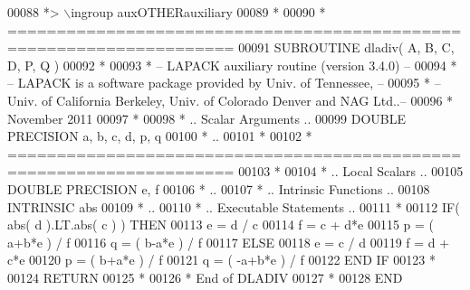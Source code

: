 \begin{DoxyCode}
00088 \textcolor{comment}{*> \(\backslash\)ingroup auxOTHERauxiliary}
00089 \textcolor{comment}{*}
00090 \textcolor{comment}{*  =====================================================================}
00091 \textcolor{keyword}{      SUBROUTINE }dladiv( A, B, C, D, P, Q )
00092 \textcolor{comment}{*}
00093 \textcolor{comment}{*  -- LAPACK auxiliary routine (version 3.4.0) --}
00094 \textcolor{comment}{*  -- LAPACK is a software package provided by Univ. of Tennessee,    --}
00095 \textcolor{comment}{*  -- Univ. of California Berkeley, Univ. of Colorado Denver and NAG Ltd..--}
00096 \textcolor{comment}{*     November 2011}
00097 \textcolor{comment}{*}
00098 \textcolor{comment}{*     .. Scalar Arguments ..}
00099       \textcolor{keywordtype}{DOUBLE PRECISION}   a, b, c, d, p, q
00100 \textcolor{comment}{*     ..}
00101 \textcolor{comment}{*}
00102 \textcolor{comment}{*  =====================================================================}
00103 \textcolor{comment}{*}
00104 \textcolor{comment}{*     .. Local Scalars ..}
00105       \textcolor{keywordtype}{DOUBLE PRECISION}   e, f
00106 \textcolor{comment}{*     ..}
00107 \textcolor{comment}{*     .. Intrinsic Functions ..}
00108       \textcolor{keywordtype}{INTRINSIC}          abs
00109 \textcolor{comment}{*     ..}
00110 \textcolor{comment}{*     .. Executable Statements ..}
00111 \textcolor{comment}{*}
00112       \textcolor{keywordflow}{IF}( abs( d ).LT.abs( c ) ) \textcolor{keywordflow}{THEN}
00113          e = d / c
00114          f = c + d*e
00115          p = ( a+b*e ) / f
00116          q = ( b-a*e ) / f
00117       \textcolor{keywordflow}{ELSE}
00118          e = c / d
00119          f = d + c*e
00120          p = ( b+a*e ) / f
00121          q = ( -a+b*e ) / f
00122 \textcolor{keywordflow}{      END IF}
00123 \textcolor{comment}{*}
00124       \textcolor{keywordflow}{RETURN}
00125 \textcolor{comment}{*}
00126 \textcolor{comment}{*     End of DLADIV}
00127 \textcolor{comment}{*}
00128 \textcolor{keyword}{      END}
\end{DoxyCode}
